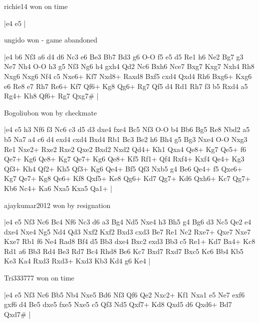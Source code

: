 \showboard

richie14 won on time

\makegametitle
|e4 e5  |

\showboard

ungido won - game abandoned

\makegametitle
|e4 b6 Nf3 a6 d4 d6 Nc3 e6 Be3 Bb7 Bd3 g6 O-O f5 e5 d5 Re1 h6 Ne2 Bg7 g3 Ne7 Nh4 O-O h3 g5 Nf3 Ng6 h4 gxh4 Qd2 Nc6 Bxh6 Nce7 Bxg7 Kxg7 Nxh4 Rh8 Nxg6 Nxg6 Nf4 c5 Nxe6+ Kf7 Nxd8+ Raxd8 Bxf5 cxd4 Qxd4 Rh6 Bxg6+ Kxg6 e6 Re8 e7 Rh7 Re6+ Kf7 Qf6+ Kg8 Qg6+ Rg7 Qf5 d4 Rd1 Rh7 f3 b5 Rxd4 a5 Rg4+ Kh8 Qf6+ Rg7 Qxg7\#  |

\showboard

Bogoliubon won by checkmate

\makegametitle
|e4 e5 h3 Nf6 f3 Nc6 c3 d5 d3 dxe4 fxe4 Bc5 Nf3 O-O b4 Bb6 Bg5 Re8 Nbd2 a5 b5 Na7 a4 c6 d4 exd4 cxd4 Bxd4 Rb1 Bc3 Be2 h6 Bh4 g5 Bg3 Nxe4 O-O Nxg3 Re1 Nxe2+ Rxe2 Rxe2 Qxe2 Bxd2 Nxd2 Qd4+ Kh1 Qxa4 Qe8+ Kg7 Qe5+ f6 Qe7+ Kg6 Qe8+ Kg7 Qe7+ Kg6 Qe8+ Kf5 Rf1+ Qf4 Rxf4+ Kxf4 Qe4+ Kg3 Qf3+ Kh4 Qf2+ Kh5 Qf3+ Kg6 Qe4+ Bf5 Qf3 Nxb5 g4 Be6 Qe4+ f5 Qxe6+ Kg7 Qe7+ Kg8 Qe6+ Kf8 Qxf5+ Ke8 Qg6+ Kd7 Qg7+ Kd6 Qxh6+ Kc7 Qg7+ Kb6 Nc4+ Ka6 Nxa5 Kxa5 Qa1+  |

\showboard

ajaykumar2012 won by resignation

\makegametitle
|e4 e5 Nf3 Nc6 Bc4 Nf6 Nc3 d6 a3 Bg4 Nd5 Nxe4 h3 Bh5 g4 Bg6 d3 Nc5 Qe2 e4 dxe4 Nxe4 Ng5 Nd4 Qd3 Nxf2 Kxf2 Bxd3 cxd3 Be7 Re1 Nc2 Rxe7+ Qxe7 Nxe7 Kxe7 Rb1 f6 Ne4 Rad8 Bf4 d5 Bb3 dxe4 Bxc2 exd3 Bb3 c5 Re1+ Kd7 Ba4+ Kc8 Rd1 a6 Bb3 Rd4 Be3 Rd7 Bc4 Rhd8 Be6 Kc7 Bxd7 Rxd7 Bxc5 Kc6 Bb4 Kb5 Ke3 Ka4 Rxd3 Rxd3+ Kxd3 Kb3 Kd4 g6 Ke4  |

\showboard

Tri333777 won on time

\makegametitle
|e4 e5 Nf3 Nc6 Bb5 Nb4 Nxe5 Bd6 Nf3 Qf6 Qe2 Nxc2+ Kf1 Nxa1 e5 Ne7 exf6 gxf6 d4 Be5 dxe5 fxe5 Nxe5 c5 Qf3 Nd5 Qxf7+ Kd8 Qxd5 d6 Qxd6+ Bd7 Qxd7\#  |

\showboard

